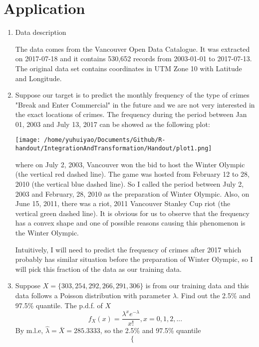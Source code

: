 \section{Application}
\begin{enumerate}
	\item Data description\cite{civ17}
	\par The data comes from the Vancouver Open Data Catalogue. It was extracted on 2017-07-18 and it contains 530,652 records from 2003-01-01 to 2017-07-13. The original data set contains coordinates in UTM Zone 10 with Latitude and Longitude.
	\item Suppose our target is to predict the monthly frequency of the type of crimes "Break and Enter Commercial" in the future and we are not very interested in the exact locations of crimes. The frequency during the period between Jan 01, 2003 and July 13, 2017 can be showed as the following plot:
	\begin{center}
		\texttt{[image: /home/yuhuiyao/Documents/Github/R-handout/IntegrationAndTransformation/Handout/plot1.png]}
	\end{center}
	where on July 2, 2003, Vancouver won the bid to host the Winter Olympic (the vertical red dashed line). The game was hosted from February 12 to 28, 2010 (the vertical blue dashed line). So I called the period between July 2, 2003 and February, 28, 2010 as the preparation of Winter Olympic. Also, on June 15, 2011, there was a riot, 2011 Vancouver Stanley Cup riot (the vertical green dashed line). It is obvious for us to observe that the frequency has a convex shape and one of possible reasons causing this phenomenon is the Winter Olympic. 
	\par Intuitively, I will need to predict the frequency of crimes after 2017 which probably has similar situation before the preparation of Winter Olympic, so I will pick this fraction of the data as our training data.
	\item
	\par Suppose $X = \{303, 254, 292, 266, 291, 306\}$ is from our training data and this data follows a Poisson distribution with parameter $\lambda$. Find out the 2.5\% and 97.5\% quantile. The p.d.f. of $X$
	\begin{equation*}
		f_X(x) = \frac{\lambda^{x}e^{-\lambda}}{x!} , x = 0, 1, 2, ...
	\end{equation*}
	By m.l.e, $\hat{\lambda} = \bar{X} = 285.3333$, so the 2.5\% and 97.5\% quantile
	\begin{equation*}
		\begin{cases}

\end{cases}
\end{equation*}
\end{enumerate}
